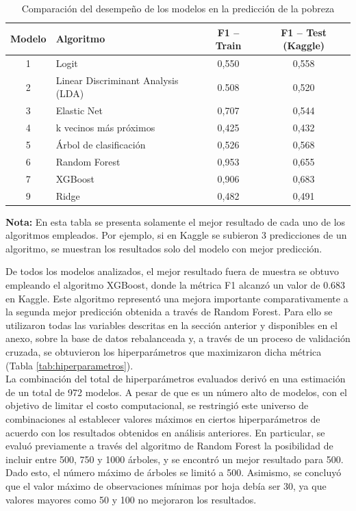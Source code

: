 \documentclass[a4paper]{article}
\theoremstyle{remark}
\theoremstyle{definition}
\begin{document}
\vspace{-0.5cm}
\begin{table}[h!]
\centering
\caption{Comparación del desempeño de los modelos en la predicción de la pobreza}
\label{tab:modelos}
\begin{tabular}{|c|l|c|c|}
\hline
\textbf{Modelo} & \textbf{Algoritmo} & \textbf{F1 – Train} & \textbf{F1 – Test (Kaggle)} \\ \hline
1              & Logit & 0,550  & 0,558 \\ \hline
2              & Linear Discriminant Analysis (LDA) & 0.508 & 0,520 \\ \hline
3              & Elastic Net & 0,707 & 0,544 \\ \hline
4              & k vecinos más próximos & 0,425 & 0,432 \\ \hline
5              & Árbol de clasificación & 0,526 & 0,568 \\ \hline
6              & Random Forest & 0,953 & 0,655 \\ \hline
7              & XGBoost & 0,906 & 0,683 \\ \hline
9              & Ridge & 0,482 & 0,491 \\ \hline

\end{tabular}

\scriptsize{\textbf{Nota:} En esta tabla se presenta solamente el mejor resultado de cada uno de los algoritmos empleados. Por ejemplo, si en Kaggle se subieron 3 predicciones de un algoritmo, se muestran los resultados solo del modelo con mejor predicción.
} \\

\normalsize
\end{table}

De todos los modelos analizados, el mejor resultado fuera de muestra se obtuvo empleando el algoritmo XGBoost, donde la métrica F1 alcanzó un valor de 0.683 en Kaggle. Este algoritmo representó una mejora importante comparativamente a la segunda mejor predicción obtenida a través de Random Forest. Para ello se utilizaron todas las variables descritas en la sección anterior y disponibles en el anexo, sobre la base de datos rebalanceada y, a través de un proceso de validación cruzada, se obtuvieron los hiperparámetros que maximizaron dicha métrica (Tabla \ref{tab:hiperparametros}).\\

La combinación del total de hiperparámetros evaluados derivó en una estimación de un total de 972 modelos. A pesar de que es un número alto de modelos, con el objetivo de limitar el costo computacional, se restringió este universo de combinaciones al establecer valores máximos en ciertos hiperparámetros de acuerdo con los resultados obtenidos en análisis anteriores. En particular, se evaluó previamente a través del algoritmo de Random Forest la posibilidad de incluir entre 500, 750 y 1000 árboles, y se encontró un mejor resultado para 500. Dado esto, el número máximo de árboles se limitó a 500. Asimismo, se concluyó que el valor máximo de observaciones mínimas por hoja debía ser 30, ya que valores mayores como 50 y 100 no mejoraron los resultados.\\
\end{document}
